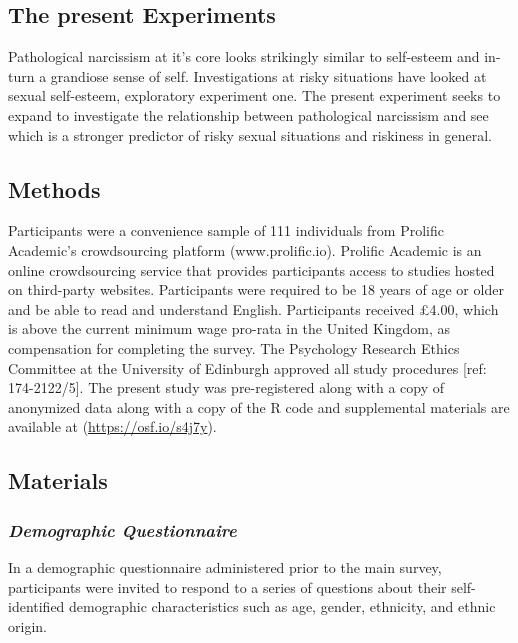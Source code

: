 \documentclass[
  donotrepeattitle,doc, 12pt, a4paper,floatsintext]{apa7}
\begin{document}
\hypertarget{the-present-experiments}{%
\subsection{The present Experiments}\label{the-present-experiments}}

Pathological narcissism at it's core looks strikingly similar to self-esteem and in-turn a grandiose sense of self. Investigations at risky situations have looked at sexual self-esteem, exploratory experiment one. The present experiment seeks to expand to investigate the relationship between pathological narcissism and see which is a stronger predictor of risky sexual situations and riskiness in general.

\hypertarget{methods-2}{%
\subsection{Methods}\label{methods-2}}

Participants were a convenience sample of 111 individuals from Prolific Academic's crowdsourcing platform (www.prolific.io). Prolific Academic is an online crowdsourcing service that provides participants access to studies hosted on third-party websites. Participants were required to be 18 years of age or older and be able to read and understand English. Participants received £4.00, which is above the current minimum wage pro-rata in the United Kingdom, as compensation for completing the survey. The Psychology Research Ethics Committee at the University of Edinburgh approved all study procedures {[}ref: 174-2122/5{]}. The present study was pre-registered along with a copy of anonymized data along with a copy of the R code and supplemental materials are available at (\url{https://osf.io/s4j7y}).

\hypertarget{materials-3}{%
\subsection{Materials}\label{materials-3}}

\hypertarget{demographic-questionnaire-2}{%
\subsubsection{\texorpdfstring{\emph{Demographic Questionnaire}}{Demographic Questionnaire}}\label{demographic-questionnaire-2}}

In a demographic questionnaire administered prior to the main survey, participants were invited to respond to a series of questions about their self-identified demographic characteristics such as age, gender, ethnicity, and ethnic origin.
\end{document}
